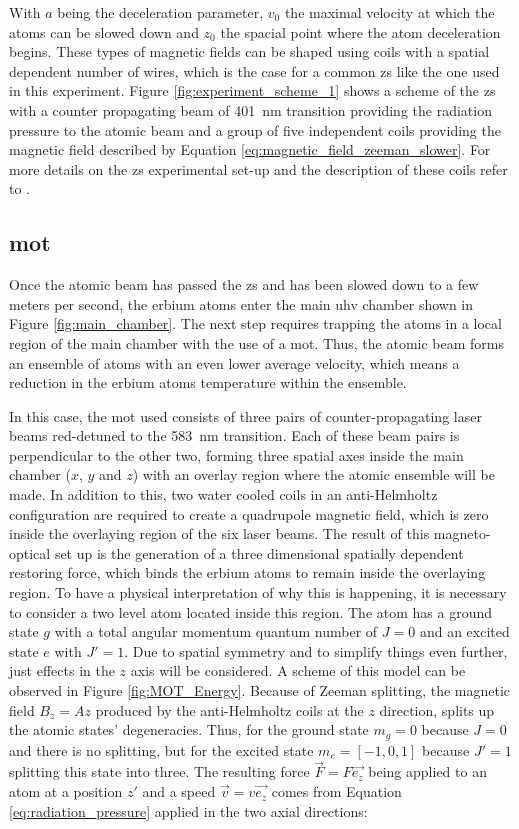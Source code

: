 With $a$ being the deceleration parameter, $v_0$ the maximal velocity at which the atoms can be slowed down and $z_0$ the spacial point where the atom deceleration begins. These types of magnetic fields can be shaped using coils with a spatial dependent number of wires, which is the case for a common \acf{zs} like the one used in this experiment. Figure \ref{fig:experiment_scheme_1} shows a scheme of the \ac{zs} with a counter propagating beam of \SI{401}{\nano\meter} transition providing the radiation pressure to the atomic beam and a group of five independent coils providing the magnetic field described by Equation \eqref{eq:magnetic_field_zeeman_slower}. For more details on the \ac{zs} experimental set-up and the description of these coils refer to \cite{Rehberger2013}.

\subsection{\Acl{mot}}

Once the atomic beam has passed the \ac{zs} and has been slowed down to a few meters per second, the erbium atoms enter the main \ac{uhv} chamber shown in Figure \ref{fig:main_chamber}. The next step requires trapping the atoms in a local region of the main chamber with the use of a \Acf{mot}. Thus, the atomic beam forms an ensemble of atoms with an even lower average velocity, which means a reduction in the erbium atoms temperature within the ensemble. 

\pagebreak

In this case, the \ac{mot} used consists of three pairs of counter-propagating laser beams red-detuned to the \SI{583}{\nano\meter} transition. Each of these beam pairs is perpendicular to the other two, forming three spatial axes inside the main chamber ($x$, $y$ and $z$) with an overlay region where the atomic ensemble will be made. In addition to this, two water cooled coils in an anti-Helmholtz configuration are required to create a quadrupole magnetic field, which is zero inside the overlaying region of the six laser beams. The result of this magneto-optical set up is the generation of a three dimensional spatially dependent restoring force, which binds the erbium atoms to remain inside the overlaying region. To have a physical interpretation of why this is happening, it is necessary to consider a two level atom located inside this region. The atom has a ground state $g$ with a total angular momentum quantum number of $J=0$ and an excited state $e$ with $J'=1$. Due to spatial symmetry and to simplify things even further, just effects in the $z$ axis will be considered. A scheme of this model can be observed in Figure \ref{fig:MOT_Energy}. Because of Zeeman splitting, the magnetic field $B_z = A z$ produced by the anti-Helmholtz coils at the $z$ direction, splits up the atomic states' degeneracies. Thus, for the ground state $m_g = 0$ because $J=0$ and there is no splitting, but for the excited state $m_e = [-1, 0, 1]$ because $J'=1$ splitting this state into three. The resulting force $\vec{F} = F \vec{e_z}$ being applied to an atom at a position $z'$ and a speed $\vec{v} = v \vec{e_z}$ comes from Equation \eqref{eq:radiation_pressure} applied in the two axial directions:

